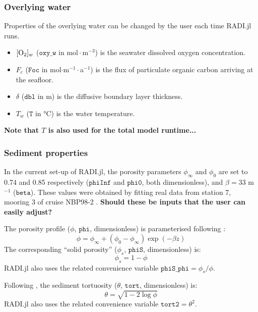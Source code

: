 \documentclass[a4paper]{article}
\newcommand{\code}[1]{\texttt{#1}}
\newcommand{\molmmm}{\mathrm{mol}\cdot\mathrm{m}^{-3}}
\newcommand{\degC}{\si{\degree}\mathrm{C}}
\newcommand{\wtf}[1]{\textcolor{Cerulean}{\textbf{#1}}}
\begin{document}
\subsubsection{Overlying water}

Properties of the overlying water can be changed by the user each time RADI.jl runs.

\begin{itemize}
  \item $[\ce{O2}]_w$ ($\code{oxy\_w}$ in $\molmmm$) is the seawater dissolved oxygen concentration.
  \item $F_c$ ($\code{Foc}$ in mol$\cdot$m$^{-1}\cdot$a$^{-1}$) is the flux of particulate organic carbon arriving at the seafloor.
  \item $\delta$ ($\code{dbl}$ in m) is the diffusive boundary layer thickness.
  \item $T_w$ ($\code{T}$ in $\degC$) is the water temperature.
\end{itemize}
\wtf{Note that $T$ is also used for the total model runtime...}

\subsubsection{Sediment properties}

In the current set-up of RADI.jl, the porosity parameters $\phi_\infty$ and $\phi_0$ are set to 0.74 and 0.85 respectively ($\code{phiInf}$ and $\code{phi0}$, both dimensionless), and $\beta = 33$ m$^{-1}$ ($\code{beta}$). These values were obtained by fitting real data from station 7, mooring 3 of cruise NBP98-2 \citep{sayles_benthic_2001}. \wtf{Should these be inputs that the user can easily adjust?}

The porosity profile ($\phi$, $\code{phi}$, dimensionless) is parameterised following \citet{boudreau_method--lines_1996}:
\begin{equation}\label{phi}
\phi = \phi_\infty + (\phi_0 - \phi_\infty) \exp(-\beta z)
\end{equation}
The corresponding ``solid porosity'' ($\phi_s$, $\code{phiS}$, dimensionless) is:
\begin{equation}\label{phiS}
\phi_s = 1 - \phi
\end{equation}
RADI.jl also uses the related convenience variable $\code{phiS\_phi} = \phi_s/\phi$.

Following \citet{boudreau_diffusive_1996}, the sediment tortuosity ($\theta$, $\code{tort}$, dimensionless) is:
\begin{equation}\label{tort}
\theta = \sqrt{1 - 2 \log \phi}
\end{equation}
RADI.jl also uses the related convenience variable $\code{tort2} = \theta^2$.
\end{document}
